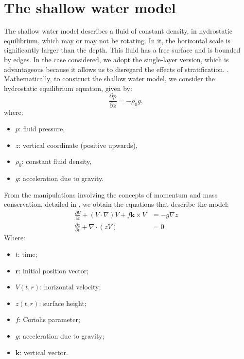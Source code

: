 \section{The shallow water model} \label{sec:ch01_shallow_water}
The shallow water model describes a fluid of constant density, in hydrostatic equilibrium, which may or may not be rotating. In it, the horizontal scale is significantly larger than the depth. This fluid has a free surface and is bounded by edges. In the case considered, we adopt the single-layer version, which is advantageous because it allows us to disregard the effects of stratification. \citep{Vallis2017}.
Mathematically, to construct the shallow water model, we consider the hydrostatic equilibrium equation, given by:
\begin{equation}
    
\frac{\partial p}{\partial z} = - \rho_0g, \label{eq:equilibrio_hidrostatico}
\end{equation}
where:
\begin{itemize}
    \item $p$: fluid pressure,
    \item $z$: vertical coordinate (positive upwards),
    \item $\rho_0$: constant fluid density,
    \item $g$: acceleration due to gravity.
\end{itemize}
From the manipulations involving the concepts of momentum and mass conservation, detailed in \citet{Vallis2017}, we obtain the equations that describe the model:
\begin{align}
\frac
{\partial V}{\partial t} + (V \cdot \nabla)V + f \mathbf{k} \times V & = -g \nabla z \label{eq:shallow-water-1} \\
    \frac{\partial z}{\partial t} + \nabla \cdot (z V)                        & = 0 \label{eq:shallow-water-2}
    
\end{align}
Where:
\begin{itemize}
    \item $t$: time;
    \item $\mathbf{r}$: initial position vector;
    \item $V(t,r)$: horizontal velocity;
    \item $z(t,r)$: surface height;
    \item $f$: Coriolis parameter;
    
\item $g$: acceleration due to gravity;
    \item $\mathbf{k}$: vertical vector.
\end{itemize}
